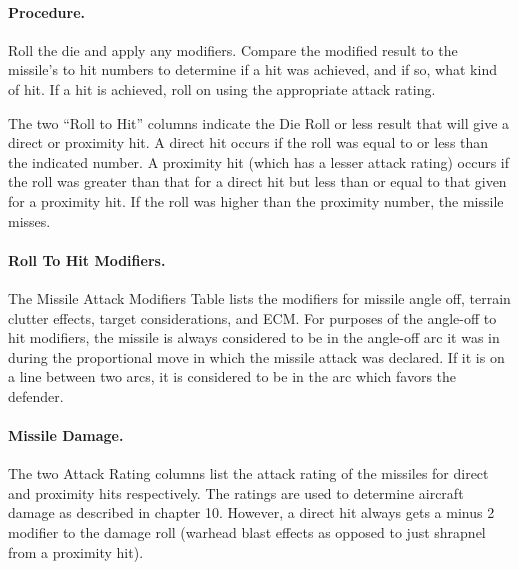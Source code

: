 \paragraph{Procedure.} Roll the die and apply any modifiers. Compare the modified result to the missile's to hit numbers to determine if a hit was achieved, and if so, what kind of hit. If a hit is achieved, roll on  using the appropriate attack rating.


The two “Roll to Hit” columns  indicate the Die Roll or less result that will give a direct or proximity hit. A direct hit occurs if the roll was equal to or less than the indicated number. A proximity hit (which has a lesser attack rating) occurs if the roll was greater than that for a direct hit but less than or equal to that given for a proximity hit. If the roll was higher than the proximity number, the missile misses.

\paragraph{Roll To Hit Modifiers.} The Missile Attack Modifiers Table lists the modifiers for missile angle off, terrain clutter effects, target considerations, and ECM. For purposes of the angle-off to hit modifiers, the missile is always considered to be in the angle-off arc it was in during the proportional move in which the missile attack was declared. If it is on a line between two arcs, it is considered to be in the arc which favors the defender.

\paragraph{Missile Damage.} The two Attack Rating columns  list the attack rating of the missiles for direct and proximity hits respectively. The ratings are used to determine aircraft damage as described in chapter 10. However, a direct hit always gets a minus 2 modifier to the damage roll (warhead blast effects as opposed to just shrapnel from a proximity hit).

\label{rule:engaging-missiles}

